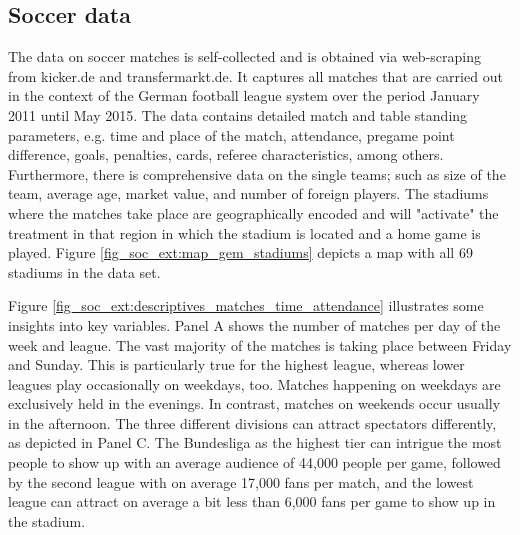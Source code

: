 \documentclass[11pt, a4paper, draft]{article} %
\begin{document}
\subsection{Soccer data}
The data on soccer matches is self-collected and is obtained via web-scraping from kicker.de and transfermarkt.de. It captures all matches that are carried out in the context of the German football league system over the period January 2011 until May 2015. The data contains detailed match and table standing parameters, e.g. time and place of the match, attendance, pregame point difference, goals, penalties, cards, referee characteristics, among others. Furthermore, there is comprehensive data on the single teams; such as size of the team, average age, market value, and number of foreign players. The stadiums where the matches take place are geographically encoded and will "activate" the treatment in that region in which the stadium is located and a home game is played. Figure \ref{fig_soc_ext:map_gem_stadiums} depicts a map with all 69 stadiums in the data set. 


Figure \ref{fig_soc_ext:descriptives_matches_time_attendance} illustrates some insights into key variables. Panel A shows the number of matches per day of the week and league. The vast majority of the matches is taking place between Friday and Sunday. This is particularly true for the highest league, whereas lower leagues play occasionally on weekdays, too. Matches happening on weekdays are exclusively held in the evenings. In contrast, matches on weekends occur usually in the afternoon. The three different divisions can attract spectators differently, as depicted in Panel C. The Bundesliga as the highest tier can intrigue the most people to show up with an average audience of 44,000 people per game, followed by the second league with on average 17,000 fans per match, and the lowest league can attract on average a bit less than 6,000 fans per game to show up in the stadium.
\end{document}
